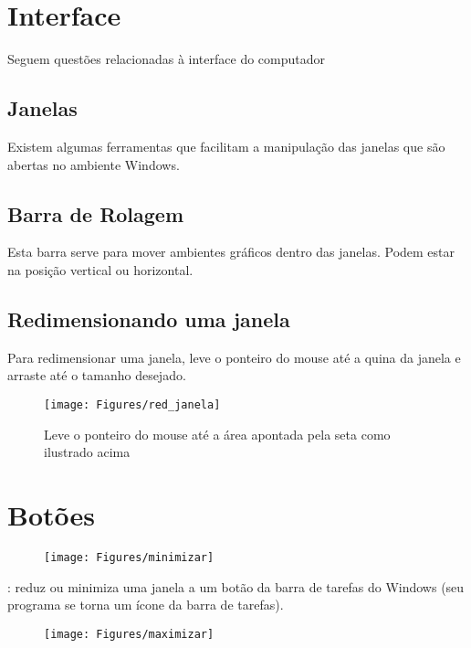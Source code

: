 \documentclass[hidelinks,12pt]{article}
\begin{document}
	\section{Interface}	
	Seguem questões relacionadas à interface do computador
	
	\subsection{Janelas}
	Existem algumas ferramentas que facilitam a manipulação das janelas que são abertas no ambiente Windows.
	
	\subsection{Barra de Rolagem}
	Esta barra serve para mover ambientes gráficos dentro das janelas. Podem estar na posição vertical ou horizontal.
	
	\subsection{Redimensionando uma janela}
	Para redimensionar uma janela, leve o ponteiro do mouse até a quina da janela e arraste até o tamanho desejado.
	
	\begin{figure}[!h]
		\centering
		\texttt{[image: Figures/red\_janela]}
		\caption{Leve o ponteiro do mouse até a área apontada pela seta como ilustrado acima}
		\label{fig:redimensionando janela}
		
	\end{figure}
	
	
	\section{Botões}
	
	
	\begin{figure}[!h]
			\texttt{[image: Figures/minimizar]}
			\label{fig:min }
	\end{figure}
	
	\vspace{-1cm}{\bf Botão Minimizar}: reduz ou minimiza uma janela a um botão da barra de tarefas do Windows (seu programa se torna um ícone da barra de tarefas).
	
	\begin{figure}[!h]
		\texttt{[image: Figures/maximizar]}
		\label{fig:max}
	\end{figure}
	
\end{document}
